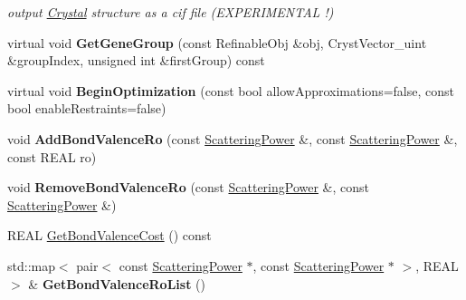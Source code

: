 \begin{DoxyCompactItemize}
\begin{DoxyCompactList}\small\item\em output \mbox{\hyperlink{class_obj_cryst_1_1_crystal}{Crystal}} structure as a cif file (E\+X\+P\+E\+R\+I\+M\+E\+N\+T\+AL !) \end{DoxyCompactList}\item 
\mbox{\label{class_obj_cryst_1_1_crystal_aec38a63c2c5472a7c7526ce21aebeb03}} 
virtual void {\bfseries Get\+Gene\+Group} (const Refinable\+Obj \&obj, Cryst\+Vector\+\_\+uint \&group\+Index, unsigned int \&first\+Group) const
\item 
\mbox{\label{class_obj_cryst_1_1_crystal_a86c21e65c777080c0313c862120aac49}} 
virtual void {\bfseries Begin\+Optimization} (const bool allow\+Approximations=false, const bool enable\+Restraints=false)
\item 
\mbox{\label{class_obj_cryst_1_1_crystal_a8b12fd9aae0c485bcdb17ac4fa4a17fc}} 
void {\bfseries Add\+Bond\+Valence\+Ro} (const \mbox{\hyperlink{class_obj_cryst_1_1_scattering_power}{Scattering\+Power}} \&, const \mbox{\hyperlink{class_obj_cryst_1_1_scattering_power}{Scattering\+Power}} \&, const R\+E\+AL ro)
\item 
\mbox{\label{class_obj_cryst_1_1_crystal_aca3dd86f521af211c6057c547fa907a6}} 
void {\bfseries Remove\+Bond\+Valence\+Ro} (const \mbox{\hyperlink{class_obj_cryst_1_1_scattering_power}{Scattering\+Power}} \&, const \mbox{\hyperlink{class_obj_cryst_1_1_scattering_power}{Scattering\+Power}} \&)
\item 
R\+E\+AL \mbox{\hyperlink{class_obj_cryst_1_1_crystal_a1a2c5c9fed8417d83cef0ef3ff36418e}{Get\+Bond\+Valence\+Cost}} () const
\item 
\mbox{\label{class_obj_cryst_1_1_crystal_a802589f455e97d95ee158b19e896415f}} 
std\+::map$<$ pair$<$ const \mbox{\hyperlink{class_obj_cryst_1_1_scattering_power}{Scattering\+Power}} $\ast$, const \mbox{\hyperlink{class_obj_cryst_1_1_scattering_power}{Scattering\+Power}} $\ast$ $>$, R\+E\+AL $>$ \& {\bfseries Get\+Bond\+Valence\+Ro\+List} ()
\item 
\mbox{\label{class_obj_cryst_1_1_crystal_aae79291a0c4e2e0375fca897a435475d}} 

\end{DoxyCompactItemize}
